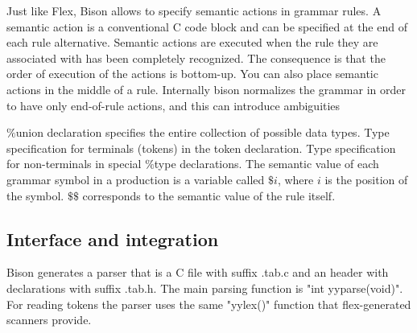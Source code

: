 Just like Flex, Bison allows to specify semantic actions in grammar rules. A semantic action is a conventional C code block and can be specified at the end of 
each rule alternative. Semantic actions are executed when the rule they are associated with has been completely recognized. The consequence is that the order of 
execution of the actions is bottom-up. You can also place semantic actions in the middle of a rule. Internally bison normalizes the grammar in order to have only
end-of-rule actions, and this can introduce ambiguities

$\%$union declaration specifies the entire collection of possible data types. Type specification for terminals (tokens) in the token declaration. Type 
specification for non-terminals in special $\%$type declarations. The semantic value of each grammar symbol in a production is a variable called $\$i$, where 
$i$ is the position of the symbol. $\$\$$ corresponds to the semantic value of the rule itself. 

\subsection*{Interface and integration}
Bison generates a parser that is a C file with suffix .tab.c and an header with declarations with suffix .tab.h. The main parsing function is "int yyparse(void)". 
For reading tokens the parser uses the same "yylex()" function that flex-generated scanners provide. 

